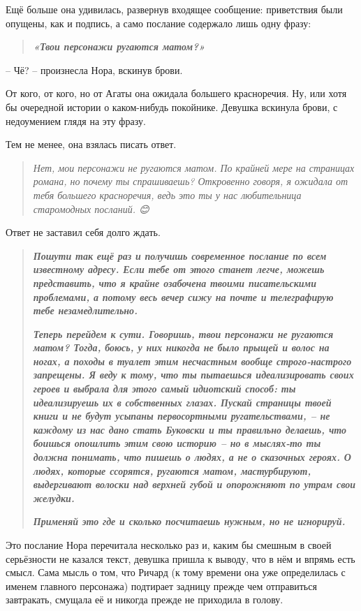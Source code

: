 \documentclass[
  a5paperpaper,
  DIV=11,
  numbers=noendperiod]{scrreprt}
\begin{document}
Ещё больше она удивилась, развернув входящее сообщение: приветствия были
опущены, как и подпись, а само послание содержало лишь одну фразу:

\begin{quote}
\textbf{\emph{«Твои персонажи ругаются матом?»}}
\end{quote}

-- Чё? -- произнесла Нора, вскинув брови.

От кого, от кого, но от Агаты она ожидала большего красноречия. Ну, или
хотя бы очередной истории о каком-нибудь покойнике. Девушка вскинула
брови, с недоумением глядя на эту фразу.

Тем не менее, она взялась писать ответ.

\begin{quote}
\emph{Нет, мои персонажи не ругаются матом. По крайней мере на страницах
романа, но почему ты спрашиваешь? Откровенно говоря, я ожидала от тебя
большего красноречия, ведь это ты у нас любительница старомодных
посланий. 😊}
\end{quote}

Ответ не заставил себя долго ждать.

\begin{quote}
\textbf{\emph{Пошути так ещё раз и получишь современное послание по всем
известному адресу. Если тебе от этого станет легче, можешь представить,
что я крайне озабочена твоими писательскими проблемами, а потому весь
вечер сижу на почте и телеграфирую тебе незамедлительно.}}

\textbf{\emph{Теперь перейдем к сути. Говоришь, твои персонажи не
ругаются матом? Тогда, боюсь, у них никогда не было прыщей и волос на
ногах, а походы в туалет этим несчастным вообще строго-настрого
запрещены. Я веду к тому, что ты пытаешься идеализировать своих героев и
выбрала для этого самый идиотский способ: ты идеализируешь их в
собственных глазах. Пускай страницы твоей книги и не будут усыпаны
первосортными ругательствами, -- не каждому из нас дано стать Буковски и
ты правильно делаешь, что боишься опошлить этим свою историю -- но в
мыслях-то ты должна понимать, что пишешь о людях, а не о сказочных
героях. О людях, которые ссорятся, ругаются матом, мастурбируют,
выдергивают волоски над верхней губой и опорожняют по утрам свои
желудки.}}

\textbf{\emph{Применяй это где и сколько посчитаешь нужным, но не
игнорируй.}}
\end{quote}

Это послание Нора перечитала несколько раз и, каким бы смешным в своей
серьёзности не казался текст, девушка пришла к выводу, что в нём и
впрямь есть смысл. Сама мысль о том, что Ричард (к тому времени она уже
определилась с именем главного персонажа) подтирает задницу прежде чем
отправиться завтракать, смущала её и никогда прежде не приходила в
голову.
\end{document}

